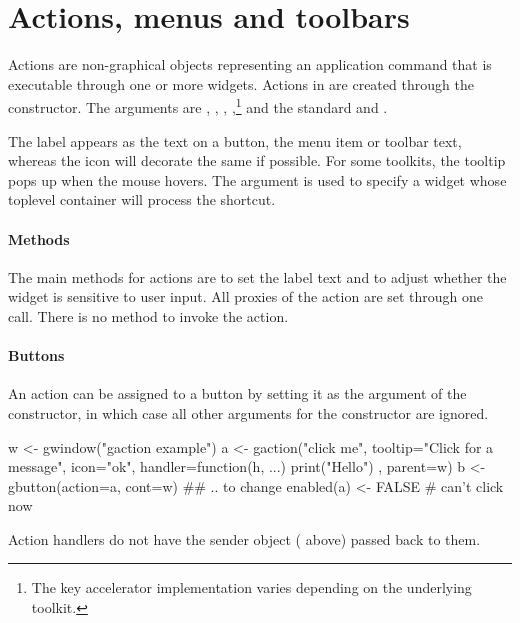 \section{Actions, menus and toolbars}
\label{sec:gWidgets-acti-menus-toolb}


Actions are non-graphical objects representing an application command
that is executable through one or more widgets. Actions in
 are created through the 
constructor. The arguments are ,
, ,
,\footnote{The key accelerator
  implementation varies depending on the underlying toolkit. }
 and the standard
 and . 

The label appears as the text on a button, the menu item or toolbar
text, whereas the icon will decorate the same if possible. For some
toolkits, the tooltip pops up when the mouse hovers. The  argument is used to
specify a widget whose toplevel container will process the shortcut.

\paragraph{Methods}
The main methods for actions are  to
set the label text and  to adjust
whether the widget is sensitive to user input. All proxies of the
action are set through one call. There is no method to invoke the action.

\paragraph{Buttons}
An action can be assigned to a button by setting it as the
 argument of the  constructor,
in which case all other arguments for the constructor are ignored.

\begin{Schunk}
\begin{Sinput}
 w <- gwindow("gaction example")
 a <- gaction("click me", tooltip="Click for a message", 
              icon="ok", 
              handler=function(h, ...) {
                print("Hello")
              },
              parent=w)
 b <- gbutton(action=a, cont=w)
 ## .. to change
 enabled(a) <- FALSE                     # can't click now
\end{Sinput}
\end{Schunk}
Action handlers do not have the sender object ( above)
passed back to them.

